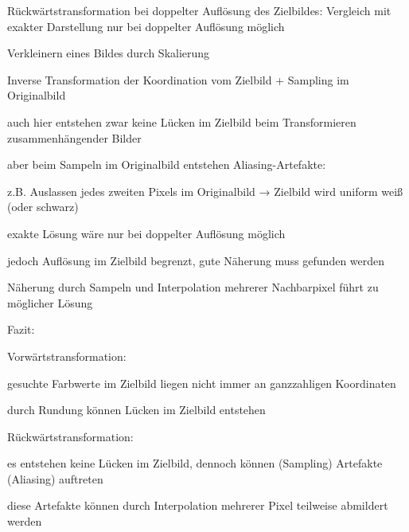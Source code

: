 \documentclass[landscape]{article}
\begin{document}
\begin{multicols}{3}
  
  Rückwärtstransformation bei doppelter Auflösung des Zielbildes: Vergleich mit exakter Darstellung nur bei doppelter Auflösung möglich
  
  Verkleinern eines Bildes durch Skalierung
  \begin{itemize*}
    \item Inverse Transformation der Koordination vom Zielbild + Sampling im Originalbild
    \begin{itemize*}
      \item auch hier entstehen zwar keine Lücken im Zielbild beim Transformieren zusammenhängender Bilder
      \item aber beim Sampeln im Originalbild entstehen Aliasing-Artefakte:
      \item z.B. Auslassen jedes zweiten Pixels im Originalbild → Zielbild wird uniform weiß (oder schwarz)
    \end{itemize*}
    \item exakte Lösung wäre nur bei doppelter Auflösung möglich
    \item jedoch Auflösung im Zielbild begrenzt, gute Näherung muss gefunden werden
    \item Näherung durch Sampeln und Interpolation mehrerer Nachbarpixel führt zu möglicher Lösung
  \end{itemize*}
  
  
  Fazit:
  \begin{itemize*}
    \item Vorwärtstransformation:
    \begin{itemize*}
      \item gesuchte Farbwerte im Zielbild liegen nicht immer an ganzzahligen Koordinaten
      \item durch Rundung können Lücken im Zielbild entstehen
    \end{itemize*}
    \item Rückwärtstransformation:
    \begin{itemize*}
      \item es entstehen keine Lücken im Zielbild, dennoch können (Sampling) Artefakte (Aliasing) auftreten
      \item diese Artefakte können durch Interpolation mehrerer Pixel teilweise abmildert werden
    \end{itemize*}
  \end{itemize*}
  

\end{multicols}
\end{document}
